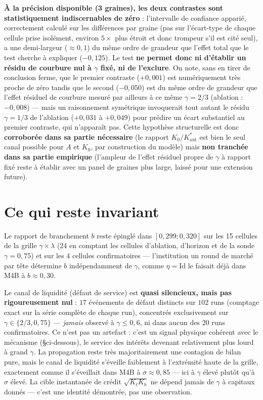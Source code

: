\documentclass[11pt,a4paper]{article}
\newcommand{\Kaut}{K^{*}_{\mathrm{aut}}}
\begin{document}
\textbf{À la précision disponible (3 graines), les deux contrastes sont
statistiquement indiscernables de zéro} : l'intervalle de confiance
apparié, correctement calculé sur les différences par graine (pas sur
l'écart-type de chaque cellule prise isolément, environ $5\times$ plus
étroit et donc trompeur s'il est cité seul), a une demi-largeur
($\approx0{,}1$) du même ordre de grandeur que l'effet total que le test
cherche à expliquer ($-0{,}125$). Le test \textbf{ne permet donc ni
d'établir un résidu de courbure nul à $\gamma$ fixé, ni de l'exclure}.
On note, sans en tirer de conclusion ferme, que le premier contraste
($+0{,}001$) est numériquement très proche de zéro tandis que le second
($-0{,}050$) est du même ordre de grandeur que l'effet résiduel de
courbure mesuré par ailleurs à ce même $\gamma=2/3$ (ablation :
$-0{,}008$) --- mais un raisonnement symétrique invoquerait tout autant
le résidu $\gamma=1/3$ de l'ablation ($+0{,}031$ à $+0{,}049$) pour
prédire un écart substantiel au premier contraste, qui n'apparaît pas.
Cette hypothèse structurelle est donc \textbf{corroborée dans sa partie
nécessaire} (le rapport $K_0/\Kaut$ est bien le seul canal possible pour
$A$ et $K_0$, par construction du modèle) mais \textbf{non tranchée dans
sa partie empirique} (l'ampleur de l'effet résiduel propre de $\gamma$ à
rapport fixé reste à établir avec un panel de graines plus large,
laissé pour une extension future).

\section{Ce qui reste invariant}

Le rapport de branchement $b$ reste épinglé dans
$[0{,}299;0{,}320]$ sur les 15 cellules de la grille $\gamma\times\lambda$
(24 en comptant les cellules d'ablation, d'horizon et de la sonde
$\gamma=0{,}75$) et sur les 4 cellules confirmatoires --- l'institution
\og un round de marché par tête \fg{} détermine $b$ indépendamment de
$\gamma$, comme $\eta=\mathrm{Id}$ le faisait déjà dans M4B à
$b\approx0{,}30$.

Le canal de liquidité (défaut de service) est \textbf{quasi silencieux,
mais pas rigoureusement nul} : $17$ événements de défaut distincts sur
$102$ runs (comptage exact sur la série complète de chaque run),
concentrés exclusivement sur $\gamma\in\{2/3,0{,}75\}$ --- \emph{jamais}
observé à $\gamma\le0{,}6$, ni dans aucun des 20 runs confirmatoires. Ce
n'est pas un artefact : c'est un signal physique cohérent avec le
mécanisme (§ci-dessous), le service des intérêts devenant relativement
plus lourd à grand $\gamma$. La propagation reste très majoritairement
une contagion de bilan pure, mais le canal de liquidité s'éveille
faiblement à l'extrémité haute de la grille, exactement comme il
s'éveillait dans M4B à $\sigma\approx0{,}85$ --- ici à $\gamma$ élevé
plutôt qu'à $\sigma$ élevé. La cible instantanée de crédit
$\sqrt{K_\ell K_b}$ ne dépend jamais de $\gamma$ à capitaux donnés ---
c'est une identité démontrée, pas une observation.
\end{document}
